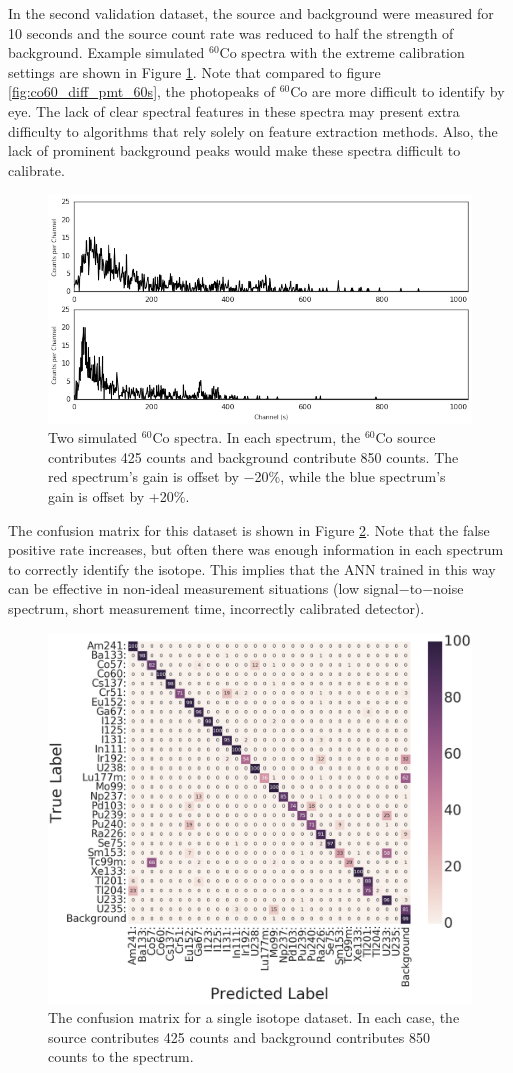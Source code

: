 \documentclass[tocnosub,noragright,centerchapter,12pt,fullpage]{uiucecethesis09}
\begin{document}
In the second validation dataset, the source and background were measured for 10 seconds and the source count rate was reduced to half the strength of background. Example simulated $^{60}$Co spectra with the extreme calibration settings are shown in Figure \ref{fig:co60_diff_pmt_10s}. Note that compared to figure \ref{fig:co60_diff_pmt_60s}, the photopeaks of $^{60}$Co are more difficult to identify by eye. The lack of clear spectral features in these spectra may present extra difficulty to algorithms that rely solely on feature extraction methods. Also, the lack of prominent background peaks would make these spectra difficult to calibrate.

\begin{figure}[H]
\centering
\includegraphics[width=0.75\linewidth]{images/Co60_both_10s}
\caption{Two simulated $^{60}$Co spectra. In each spectrum, the $^{60}$Co source contributes 425 counts and background contribute 850 counts. The red spectrum's gain is offset by $-$20\%, while the blue spectrum's gain is offset by +20\%.}
\label{fig:co60_diff_pmt_10s}
\end{figure}

The confusion matrix for this dataset is shown in Figure \ref{fig:conf_matrix_10s}. Note that the false positive rate increases, but often there was enough information in each spectrum to correctly identify the isotope. This implies that the ANN trained in this way can be effective in non-ideal measurement situations (low signal$-$to$-$noise spectrum, short measurement time, incorrectly calibrated detector).

\begin{figure}[H]
\centering
\includegraphics[width=0.7\linewidth]{images/conf_matrix_10s}
\caption{The confusion matrix for a single isotope dataset. In each case, the source contributes 425 counts and background contributes 850 counts to the spectrum.}
\label{fig:conf_matrix_10s}
\end{figure}
\end{document}
